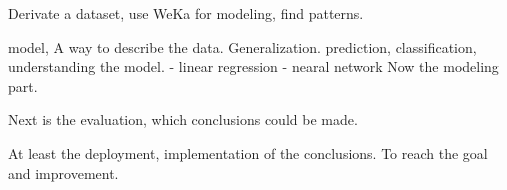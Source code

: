 	Derivate a dataset, use WeKa for modeling, find patterns.

	
	model, A way to describe the data. Generalization.
	prediction, classification, understanding the model.
	- linear regression
	- nearal network
	Now the modeling part.

	Next is the evaluation, which conclusions could be made.

	At least the deployment, implementation of the conclusions. To reach the goal and improvement. 
	\fi
